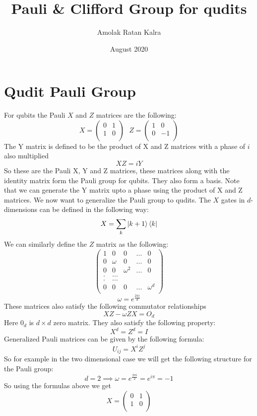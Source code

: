 \documentclass{article}
\title{Pauli \& Clifford Group for qudits}
\author{Amolak Ratan Kalra}
\date{August 2020}
\begin{document}
\maketitle
\tableofcontents
\section{Qudit Pauli Group}
For qubits the Pauli $X$ and $Z$ matrices are the following:
\[X=
\begin{pmatrix}
0 & 1\\
1 & 0\\
\end{pmatrix}~~~
Z=
\begin{pmatrix}
1 & 0\\
0 & -1\\
\end{pmatrix}
\]
The Y matrix is defined to be the product of X and Z matrices with a phase of $i$ also multiplied 
\[
XZ=iY
\]
So these are the Pauli X, Y and Z matrices, these matrices along with the identity matrix form the Pauli group for qubits. They also form a basis.
Note that we can generate the Y matrix upto a phase using the product of X and Z matrices.
We now want to generalize the Pauli group to qudits. The $X$ gates in $d$-dimensions can be defined in the following way:
\[
X=\sum_{k}\ket{k+1}\bra{k}
\]
We can similarly define the $Z$ matrix as the following:
\[
\begin{pmatrix}
1 & 0 & 0 &... & 0\\
0 & \omega & 0 &... & 0\\
0 & 0 & \omega^{2} &... & 0\\
. &...\\
. &...\\
0 & 0 & 0 &... & \omega^{d}\\
\end{pmatrix}
\]
\[
\omega=e^{\frac{2\pi{i}}{d}}
\]
These matrices also satisfy the following commutator relationships
\[
XZ-\omega{ZX}=O_{d}
\]
Here $0_{d}$ is $d\times{d}$ zero matrix. They also satisfy the following property:
\[
X^{d}=Z^{d}=I
\]
Generalized Pauli matrices can be given by the following formula:
\[
U_{ij}=X^{i}Z^{j}
\]
So for example in the two dimensional case we will get the following structure for the Pauli group:
\[
d=2 \implies \omega=e^\frac{2\pi{i}}{2}=e^{i\pi}=-1
\]
So using the formulas above we get
\[
X=
\begin{pmatrix}
0 & 1\\
1 & 0 \\
\end{pmatrix}
\]
\end{document}
